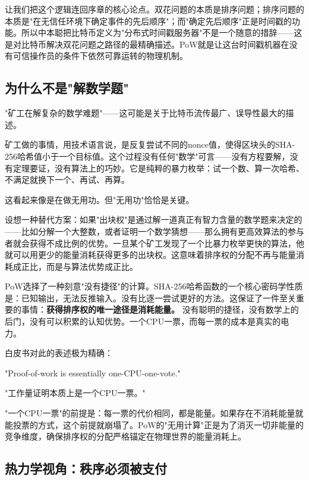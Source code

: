 \documentclass[a4paper,12pt,openany]{ctexbook}
\newenvironment{quoting}{%
  \par\vspace{0.5em}%
  \begin{list}{}{%
    \setlength{\leftmargin}{2em}%
    \setlength{\rightmargin}{2em}%
    \setlength{\parsep}{0.3em}%
    \setlength{\itemsep}{0pt}%
    \setlength{\topsep}{0pt}%
  }%
  \item\relax
}{%
  \end{list}%
  \par\vspace{0.5em}%
}
\begin{document}
让我们把这个逻辑连回序章的核心论点。双花问题的本质是排序问题；排序问题的本质是"在无信任环境下确定事件的先后顺序"；而"确定先后顺序"正是时间戳的功能。所以中本聪把比特币定义为"分布式时间戳服务器"不是一个随意的措辞——这是对比特币解决双花问题之路径的最精确描述。PoW就是让这台时间戳机器在没有可信操作员的条件下依然可靠运转的物理机制。


\subsection*{为什么不是"解数学题"}


"矿工在解复杂的数学难题"——这可能是关于比特币流传最广、误导性最大的描述。

矿工做的事情，用技术语言说，是反复尝试不同的nonce值，使得区块头的SHA-256哈希值小于一个目标值。这个过程没有任何"数学"可言——没有方程要解，没有定理要证，没有算法上的巧妙。它是纯粹的暴力枚举：试一个数、算一次哈希、不满足就换下一个、再试、再算。

这看起来像是在做无用功。但"无用功"恰恰是关键。

设想一种替代方案：如果"出块权"是通过解一道真正有智力含量的数学题来决定的——比如分解一个大整数，或者证明一个数学猜想——那么拥有更高效算法的参与者就会获得不成比例的优势。一旦某个矿工发现了一个比暴力枚举更快的算法，他就可以用更少的能量消耗获得更多的出块权。这意味着排序权的分配不再与能量消耗成正比，而是与算法优势成正比。

PoW选择了一种刻意"没有捷径"的计算。SHA-256哈希函数的一个核心密码学性质是：已知输出，无法反推输入。没有比逐一尝试更好的方法。这保证了一件至关重要的事情：\textbf{获得排序权的唯一途径是消耗能量。} 没有聪明的捷径，没有数学上的后门，没有可以积累的认知优势。一个CPU一票，而每一票的成本是真实的电力。

白皮书对此的表述极为精确：


\begin{quoting}
\small
"Proof-of-work is essentially one-CPU-one-vote."

"工作量证明本质上是一个CPU一票。"
\end{quoting}


"一个CPU一票"的前提是：每一票的代价相同，都是能量。如果存在不消耗能量就能投票的方式，这个前提就崩塌了。PoW的"无用计算"正是为了消灭一切非能量的竞争维度，确保排序权的分配严格锚定在物理世界的能量消耗上。


\subsection*{热力学视角：秩序必须被支付}
\end{document}
